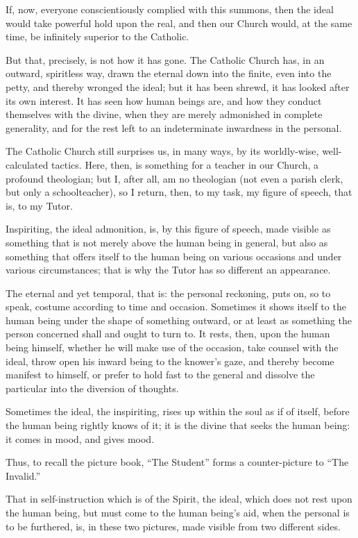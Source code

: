 \documentclass[12pt,a4paper]{book}
\begin{document}
If, now, everyone conscientiously complied with this summons, then the ideal would take powerful hold upon the real, and then our Church would, at the same time, be infinitely superior to the Catholic.

But that, precisely, is not how it has gone. The Catholic Church has, in an outward, spiritless way, drawn the eternal down into the finite, even into the petty, and thereby wronged the ideal; but it has been shrewd, it has looked after its own interest. It has seen how human beings are, and how they conduct themselves with the divine, when they are merely admonished in complete generality, and for the rest left to an indeterminate inwardness in the personal.

The Catholic Church still surprises us, in many ways, by its worldly-wise, well-calculated tactics. Here, then, is something for a teacher in our Church, a profound theologian; but I, after all, am no theologian (not even a parish clerk, but only a schoolteacher), so I return, then, to my task, my figure of speech, that is, to my Tutor.

Inspiriting, the ideal admonition, is, by this figure of speech, made visible as something that is not merely above the human being in general, but also as something that offers itself to the human being on various occasions and under various circumstances; that is why the Tutor has so different an appearance.

The eternal and yet temporal, that is: the personal reckoning, puts on, so to speak, costume according to time and occasion. Sometimes it shows itself to the human being under the shape of
something outward, or at least as something the person concerned shall and ought to turn to. It rests, then, upon the human being himself, whether he will make use of the occasion, take counsel with the ideal, throw open his inward being to the knower's gaze, and thereby become manifest to himself, or prefer to hold fast to the general and dissolve the particular into the diversion of thoughts.

Sometimes the ideal, the inspiriting, rises up within the soul as if of itself, before the human being rightly knows of it; it is the divine that seeks the human being: it comes in mood, and gives mood.

Thus, to recall the picture book, ``The Student'' forms a counter-picture to ``The Invalid.''

That in self-instruction which is of the Spirit, the ideal, which does not rest upon the human being, but must come to the human being's aid, when the personal is to be furthered, is, in these two pictures, made visible from two different sides.
\end{document}
